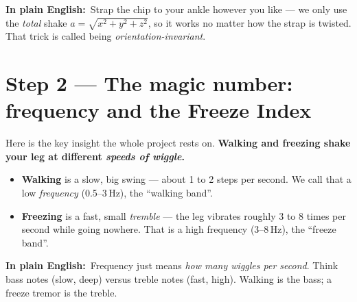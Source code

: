 \documentclass[11pt]{article}
\newcommand{\pe}{\textbf{\color{teal}In plain English:}\ }
\begin{document}
\begin{center}
\end{center}

\begin{plain}
\pe Strap the chip to your ankle however you like --- we only use the
\emph{total} shake $a=\sqrt{x^2+y^2+z^2}$, so it works no matter how the strap is
twisted. That trick is called being \emph{orientation-invariant}.
\end{plain}

\section{Step 2 --- The magic number: frequency and the Freeze Index}

Here is the key insight the whole project rests on. \textbf{Walking and freezing
shake your leg at different \emph{speeds of wiggle}.}

\begin{itemize}
  \item \textbf{Walking} is a slow, big swing --- about 1 to 2 steps per second.
        We call that a low \emph{frequency} (0.5--3\,Hz), the ``walking band''.
  \item \textbf{Freezing} is a fast, small \emph{tremble} --- the leg vibrates
        roughly 3 to 8 times per second while going nowhere. That is a high
        frequency (3--8\,Hz), the ``freeze band''.
\end{itemize}

\pe Frequency just means \emph{how many wiggles per second}. Think bass notes
(slow, deep) versus treble notes (fast, high). Walking is the bass; a freeze
tremor is the treble.
\end{document}
